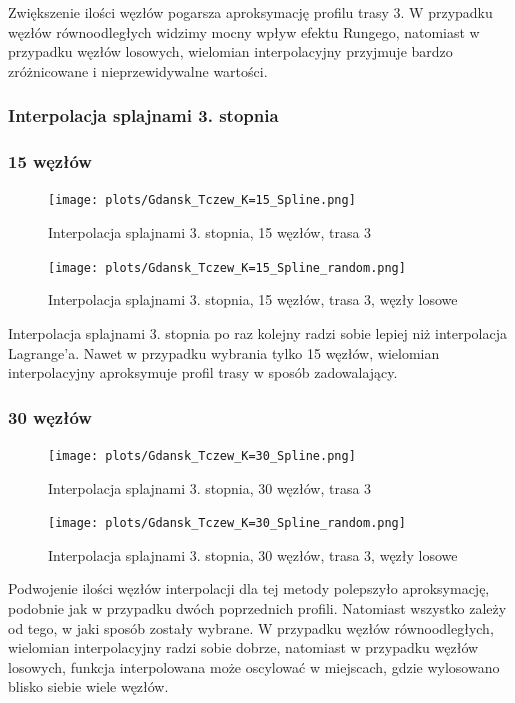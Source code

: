 \documentclass{article}
\begin{document}
Zwiększenie ilości węzłów pogarsza aproksymację profilu trasy 3. W przypadku węzłów równoodległych
widzimy mocny wpływ efektu Rungego, natomiast w przypadku węzłów losowych, wielomian interpolacyjny
przyjmuje bardzo zróżnicowane i nieprzewidywalne wartości.

\subsubsection{Interpolacja splajnami 3. stopnia}

\subsubsection*{\hfil 15 węzłów \hfil }

\begin{figure}[H]
    \centering
    \texttt{[image: plots/Gdansk\_Tczew\_K=15\_Spline.png]}
    \caption{Interpolacja splajnami 3. stopnia, 15 węzłów, trasa 3}
\end{figure}

\begin{figure}[H]
    \centering
    \texttt{[image: plots/Gdansk\_Tczew\_K=15\_Spline\_random.png]}
    \caption{Interpolacja splajnami 3. stopnia, 15 węzłów, trasa 3, węzły losowe}
\end{figure}

Interpolacja splajnami 3. stopnia po raz kolejny radzi sobie lepiej niż interpolacja Lagrange'a.
Nawet w przypadku wybrania tylko 15 węzłów, wielomian interpolacyjny aproksymuje profil trasy
w sposób zadowalający.

\subsubsection*{\hfil 30 węzłów \hfil }

\begin{figure}[H]
    \centering
    \texttt{[image: plots/Gdansk\_Tczew\_K=30\_Spline.png]}
    \caption{Interpolacja splajnami 3. stopnia, 30 węzłów, trasa 3}
\end{figure}

\begin{figure}[H]
    \centering
    \texttt{[image: plots/Gdansk\_Tczew\_K=30\_Spline\_random.png]}
    \caption{Interpolacja splajnami 3. stopnia, 30 węzłów, trasa 3, węzły losowe}
\end{figure}

Podwojenie ilości węzłów interpolacji dla tej metody polepszyło aproksymację,
podobnie jak w przypadku dwóch poprzednich profili. 
Natomiast wszystko zależy od tego, w jaki sposób zostały wybrane. 
W przypadku węzłów równoodległych, wielomian interpolacyjny
radzi sobie dobrze, natomiast w przypadku węzłów losowych, funkcja interpolowana
może oscylować w miejscach, gdzie wylosowano blisko siebie wiele węzłów.
\end{document}
